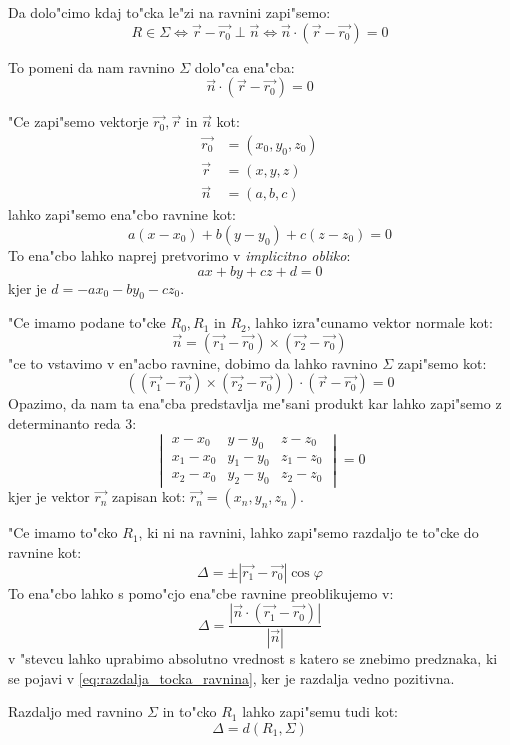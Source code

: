 Da dolo"cimo kdaj to"cka le"zi na ravnini zapi"semo:
\[
R \in \Sigma \Leftrightarrow \vec{r} - \vec{r_0} \perp \vec{n} \Leftrightarrow \vec{n} \cdot (\vec{r} - \vec{r_0}) = 0
\]

To pomeni da nam ravnino $\Sigma$ dolo"ca ena"cba:
\[
\vec{n} \cdot (\vec{r} - \vec{r_0}) = 0
\]

"Ce zapi"semo vektorje $\vec{r_0}, \vec{r}$ in $\vec{n}$ kot:
\begin{align*}
	\vec{r_0} &= (x_0, y_0, z_0)\\
	\vec{r} &= (x, y, z)\\
	\vec{n} &= (a, b, c)
\end{align*}
lahko zapi"semo ena"cbo ravnine kot:
\[
a(x - x_0) + b(y - y_0) + c(z - z_0) = 0
\]
To ena"cbo lahko naprej pretvorimo v \emph{implicitno obliko}:
\[
ax + by + cz + d = 0
\]
kjer je $d = -ax_0 - by_0 - cz_0$.

"Ce imamo podane to"cke $R_0, R_1$ in $R_2$, lahko izra"cunamo vektor normale kot:
\[
\vec{n} =  (\vec{r_1} - \vec{r_0}) \times (\vec{r_2} - \vec{r_0})
\]
"ce to vstavimo v en"acbo ravnine, dobimo da lahko ravnino $\Sigma$ zapi"semo kot:
\[
((\vec{r_1} - \vec{r_0}) \times (\vec{r_2} - \vec{r_0})) \cdot (\vec{r} - \vec{r_0}) = 0
\]
Opazimo, da nam ta ena"cba predstavlja me"sani produkt kar lahko zapi"semo z determinanto reda 3:
\[
\begin{vmatrix}
x-x_0 & y-y_0 & z-z_0 \\
x_1 - x_0 & y_1 - y_0 & z_1 - z_0\\
x_2 - x_0 & y_2 - y_0 & z_2 - z_0
\end{vmatrix} = 0
\]
kjer je vektor $\vec{r_n}$ zapisan kot: $\vec{r_n} = (x_n, y_n, z_n)$.

"Ce imamo to"cko $R_1$, ki ni na ravnini, lahko zapi"semo razdaljo te to"cke do ravnine kot:
\begin{equation}
	\label{eq:razdalja_tocka_ravnina}
	\Delta = \pm |\vec{r_1} - \vec{r_0}| \cos \varphi
\end{equation}
To ena"cbo lahko s pomo"cjo ena"cbe ravnine preoblikujemo v:
\[
\Delta = \dfrac{|\vec{n} \cdot (\vec{r_1} - \vec{r_0})|}{|\vec{n}|}
\]
v "stevcu lahko uprabimo absolutno vrednost s katero se znebimo predznaka, ki se pojavi v \eqref{eq:razdalja_tocka_ravnina}, ker je razdalja vedno pozitivna.

Razdaljo med ravnino $\Sigma$ in to"cko $R_1$ lahko zapi"semu tudi kot:
\begin{equation*}
\Delta = d(R_1, \Sigma)
\end{equation*}
